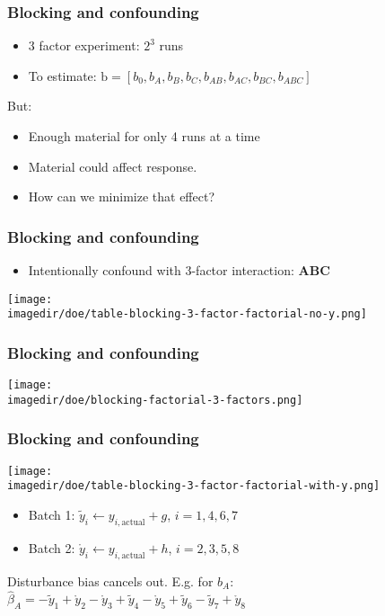 \begin{frame}\frametitle{Blocking and confounding}
	\begin{itemize}
		\item	3 factor experiment: $2^3$ runs
		\item	To estimate: $\mathrm{b} = [b_0, b_A, b_B, b_C, b_{AB}, b_{AC}, b_{BC}, b_{ABC}]$
	\end{itemize}

	But:
	\begin{itemize}
		\item	Enough material for only 4 runs at a time
		\item	Material could affect response.
		\item	How can we minimize that effect?
	\end{itemize}
\end{frame}

\begin{frame}\frametitle{Blocking and confounding}
	\begin{itemize}
		\item	Intentionally confound with 3-factor interaction: \textbf{ABC}
	\end{itemize}
	\begin{center}
		\texttt{[image: \\imagedir/doe/table-blocking-3-factor-factorial-no-y.png]}
	\end{center}
\end{frame}

\begin{frame}\frametitle{Blocking and confounding}
	\begin{center}
		\texttt{[image: \\imagedir/doe/blocking-factorial-3-factors.png]}
	\end{center}
\end{frame}

\begin{frame}\frametitle{Blocking and confounding}
	\begin{center}
		\texttt{[image: \\imagedir/doe/table-blocking-3-factor-factorial-with-y.png]}
	\end{center}
	\begin{itemize}
		\item	Batch 1: $\widetilde{y}_i \leftarrow y_{i,\text{actual}} + g$, $i = 1, 4, 6, 7$
		\item	Batch 2: $\mathring{y}_i \leftarrow y_{i,\text{actual}} + h$, $i = 2, 3, 5, 8$
	\end{itemize}

	Disturbance bias cancels out. E.g. for $b_A$: $ \widehat{\beta}_A = -\widetilde{y}_1 + \mathring{y}_2 - \mathring{y}_3 + \widetilde{y}_4 - \mathring{y}_5 + \widetilde{y}_6 - \widetilde{y}_7 + \mathring{y}_8 $
\end{frame}

